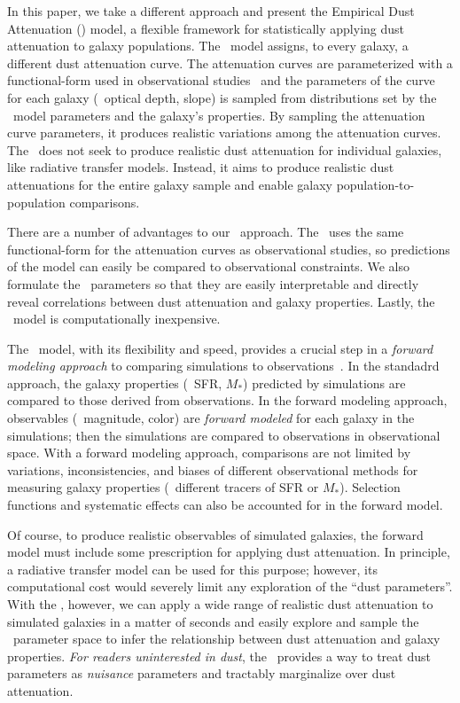 In this paper, we take a different approach and present the Empirical Dust
Attenuation (\eda) model, a flexible framework for statistically applying dust
attenuation to galaxy populations. The \eda~model assigns, to every galaxy, a
different dust attenuation curve. The attenuation curves are parameterized with
a functional-form used in observational studies~\citep{noll2009} and the
parameters of the curve for each galaxy (\eg~optical depth, slope) is sampled
from distributions set by the \eda~model parameters and the galaxy's properties.  
By sampling the attenuation curve parameters, it produces realistic variations 
among the attenuation curves. The \eda~does not seek to produce realistic dust 
attenuation for individual galaxies, like radiative transfer models. Instead, 
it aims to produce realistic dust attenuations for the entire galaxy sample and
enable galaxy population-to-population comparisons.

There are a number of advantages to our \eda~approach. The \eda~uses the same
functional-form for the attenuation curves as observational studies, so
predictions of the model can easily be compared to observational constraints. 
We also formulate the \eda~parameters so that they are easily interpretable and
directly reveal correlations between dust attenuation and galaxy properties.
Lastly, the \eda~model is computationally inexpensive. 

The \eda~model, with its flexibility and speed, provides a crucial step in a
{\em forward modeling approach} to comparing simulations to
observations~\citep[\eg][]{nelson2018, baes2019, trcka2020, dickey2020}.
In the standadrd approach, the galaxy properties (\eg~SFR, $M_*$) predicted by
simulations are compared to those derived from observations. In the forward
modeling approach, observables (\eg~magnitude, color) are {\em forward
modeled} for each galaxy in the simulations; then the simulations are compared 
to observations in observational space. With a forward modeling approach, 
comparisons are not limited by variations, inconsistencies, and biases of different
observational methods for measuring galaxy properties (\eg~different tracers of
SFR or $M_*$). Selection functions and systematic effects can also be accounted
for in the forward model. 

Of course, to produce realistic observables of simulated galaxies, the forward
model must include some prescription for applying dust attenuation. In
principle, a radiative transfer model can be used for this purpose; however,
its computational cost would severely limit any exploration of the ``dust
parameters''. With the \eda, however, we can apply a wide range of realistic
dust attenuation to simulated galaxies in a matter of seconds and easily
explore and sample the \eda~parameter space to infer the 
relationship between dust attenuation and galaxy properties. {\em For readers 
uninterested in dust}, the \eda~provides a way to treat dust parameters as
{\em nuisance} parameters and tractably marginalize over dust attenuation. 

